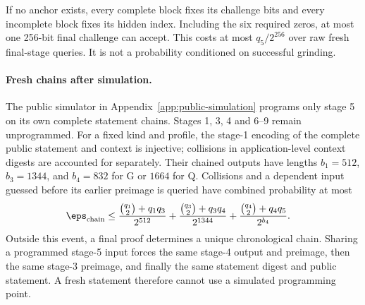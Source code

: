 If no anchor exists, every complete block fixes its challenge bits and every incomplete block fixes its hidden index. Including the six required zeros, at most one 256-bit final challenge can accept. This costs at most $q_5/2^{256}$ over raw fresh final-stage queries. It is not a probability conditioned on successful grinding.

\paragraph{Fresh chains after simulation.}
The public simulator in Appendix~\ref{app:public-simulation} programs only stage 5 on its own complete statement chains. Stages 1, 3, 4 and 6--9 remain unprogrammed. For a fixed kind and profile, the stage-1 encoding of the complete public statement and context is injective; collisions in application-level context digests are accounted for separately. Their chained outputs have lengths $b_1=512$, $b_3=1344$, and $b_4=832$ for G or $1664$ for Q. Collisions and a dependent input guessed before its earlier preimage is queried have combined probability at most
\begin{align*}
 \eps_{\rm chain}\le{}&
 \frac{\binom{q_1}{2}+q_1q_3}{2^{512}}+
 \frac{\binom{q_3}{2}+q_3q_4}{2^{1344}}+
 \frac{\binom{q_4}{2}+q_4q_5}{2^{b_4}}.
\end{align*}
Outside this event, a final proof determines a unique chronological chain. Sharing a programmed stage-5 input forces the same stage-4 output and preimage, then the same stage-3 preimage, and finally the same statement digest and public statement. A fresh statement therefore cannot use a simulated programming point.

